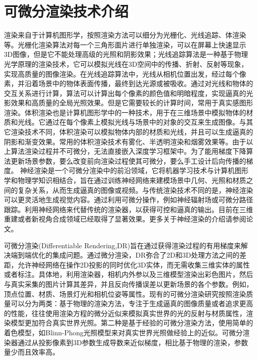 \section{可微分渲染技术介绍}
渲染来自于计算机图形学，按照渲染方法可以细分为光栅化、光线追踪、体渲染等。光栅化渲染算法对每一个三角形面片进行单独渲染，可以在屏幕上快速显示3D图像，但是它不能处理高级的光照和阴影效果；光线追踪算法是一种基于物理光学原理的渲染技术，它可以模拟光线在3D空间中的传播、折射、反射等现象，实现高质量的图像渲染。在光线追踪算法中，光线从相机位置出发，经过每个像素，并沿着场景中的物体表面传播，最终到达光源或被吸收。通过对光线和物体的交互关系进行计算，算法可以计算出每个像素的颜色值和明暗程度，实现逼真的光影效果和高质量的全局光照效果。但是它需要较长的计算时间，常用于真实感图形渲染。体积渲染也是计算机图形学中的一种技术，用于在三维场景中模拟物体的材质和光线。它通过在每个像素上模拟光线与场景中的对象的交互来生成图像。与其它渲染技术不同，体积渲染可以模拟物体内部的材质和光线，并且可以生成逼真的阴影和渐变效果。常用的体积渲染技术有雾化、半透明渲染和烟雾效果等。由于以上算法渲染过程并不可微分，无法直接嵌入深度学习框架中。为了能用梯度下降算法更新场景参数，要么改变前向渲染过程使其可微分，要么手工设计后向传播的梯度。
神经渲染是一个可微分渲染中的前沿领域，它将机器学习技术与计算机图形学和物理学知识相结合，旨在通过训练神经网络来建模场景中几何、光照和材质之间的复杂关系，从而生成逼真的图像或视频。与传统渲染技术不同的是，神经渲染可以更灵活地生成视觉内容。通过利用可微分操作，例如神经辐射场或可微分路径跟踪。利用神经网络来代替传统的渲染器，以获得可控和逼真的输出。目前在三维重建或者新视角合成领域已经取得了显著效果。更多关于神经渲染的介绍请参阅论文。\par
可微分渲染(Differentiable Rendering,DR)旨在通过获得渲染过程的有用梯度来解决端到端优化的集成问题。通过微分渲染，DR弥合了2D和3D处理方法之间的差距，允许神经网络在操作2D投影的同时优化3D实体，而无需收集三维实体的属性或者标注。具体地，利用渲染器，相机内外参以及三维模型渲染出彩色图片，然后与真实采集的图片计算其差异，并且反向传播误差以更新场景的各个参数。例如，顶点位置、材质、场景灯光和相机位姿等属性。现有的可微分渲染研究按照渲染质量可以分为两类：基于物理的渲染方法，专注于生成逼真的图像质量或者追求更高的性能，往往使用渲染方程的微分近似来模拟真实世界的光的反射与材质属性，渲染模型更加符合真实世界光照。第二种是基于经验的可微分渲染方法，使用简单的着色模型，如Blinn-Phong光照模型来对真实世界光照做经验上的近似。可微分渲染器通过从投影像素到3D参数生成导数来近似梯度，相比基于物理的渲染，参数量少而且效率高。\par
